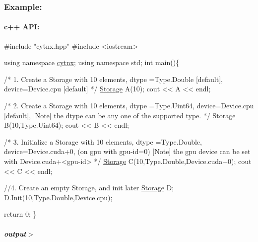 \subsubsection*{Example\+:}

\paragraph*{c++ A\+PI\+:}


\begin{DoxyCodeInclude}
\textcolor{preprocessor}{#include "cytnx.hpp"}
\textcolor{preprocessor}{#include <iostream>}


\textcolor{keyword}{using namespace }\hyperlink{namespacecytnx}{cytnx};
\textcolor{keyword}{using namespace }std;
\textcolor{keywordtype}{int} main()\{ 

    \textcolor{comment}{/*}
\textcolor{comment}{        1. Create a Storage with }
\textcolor{comment}{        10 elements, }
\textcolor{comment}{        dtype =Type.Double [default],}
\textcolor{comment}{        device=Device.cpu [default]}
\textcolor{comment}{    */}
    \hyperlink{classcytnx_1_1Storage}{Storage} A(10);
    cout << A << endl;

    \textcolor{comment}{/*}
\textcolor{comment}{        2. Create a Storage with }
\textcolor{comment}{        10 elements, }
\textcolor{comment}{        dtype =Type.Uint64,}
\textcolor{comment}{        device=Device.cpu [default],}
\textcolor{comment}{        [Note] the dtype can be any one of the supported type.}
\textcolor{comment}{    */}
    \hyperlink{classcytnx_1_1Storage}{Storage} B(10,Type.Uint64);
    cout << B << endl;

    \textcolor{comment}{/*}
\textcolor{comment}{        3. Initialize a Storage with }
\textcolor{comment}{        10 elements,}
\textcolor{comment}{        dtype =Type.Double,}
\textcolor{comment}{        device=Device.cuda+0, (on gpu with gpu-id=0)}
\textcolor{comment}{        [Note] the gpu device can be set with Device.cuda+<gpu-id>}
\textcolor{comment}{    */}
    \hyperlink{classcytnx_1_1Storage}{Storage} C(10,Type.Double,Device.cuda+0);
    cout << C << endl;

    \textcolor{comment}{//4. Create an empty Storage, and init later}
    \hyperlink{classcytnx_1_1Storage}{Storage} D;
    D.\hyperlink{classcytnx_1_1Storage_a6cf79f362c4ae68ab7623f0ebac9355e}{Init}(10,Type.Double,Device.cpu);

    \textcolor{keywordflow}{return} 0;
\}

\end{DoxyCodeInclude}
 \subparagraph*{output$>$}


